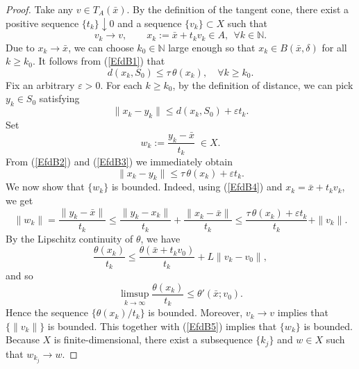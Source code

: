 \documentclass[11pt]{article}
\begin{document}
\begin{proof}
	Take any \(v\in T_A(\bar{x})\). By the definition of the tangent cone, there exist a positive sequence \(\{t_k\}\downarrow 0\) and a sequence \(\{v_k\}\subset X\) such that
	\[
	v_k\to v,\qquad x_k:=\bar{x}+t_k v_k\in A,\ \  \forall k \in \mathbb{N}.
	\]
	Due to  \(x_k\to \bar{x}\), we can choose \(k_0 \in  \mathbb{N}\) large enough so that   \(x_k\in B(\bar{x},\delta)\) for all \(k\ge k_0\).   It follows from  (\ref{EfdB1})  that
	\begin{equation}\label{EfdB2}
		d (x_k,S_0)\le \tau\,\theta(x_k), \quad  \forall k\ge k_0 .  
	\end{equation}
	Fix an arbitrary \(\varepsilon>0\). For each \(k\ge k_0\), by the definition of distance, we can pick \(y_k\in S_0\) satisfying
	\begin{equation}\label{EfdB3}
		\|x_k-y_k\| \le d (x_k,S_0) + \varepsilon t_k.  
	\end{equation}
	Set
	\[
	w_k:=\frac{y_k-\bar{x}}{t_k}\;\in X .
	\]
	From (\ref{EfdB2}) and (\ref{EfdB3}) we immediately obtain
	\begin{equation}\label{EfdB4}
		\|x_k-y_k\| \le \tau\,\theta(x_k) + \varepsilon t_k.  
	\end{equation}
	We now show that \(\{w_k\}\) is bounded. Indeed, using (\ref{EfdB4})  and \(x_k=\bar{x}+t_k v_k\),  we get
	\begin{equation}\label{EfdB5}
		\|w_k\| = \frac{\|y_k-\bar{x}\|}{t_k}
		\le \frac{\|y_k-x_k\|}{t_k} + \frac{\|x_k-\bar{x}\|}{t_k}
		\le \frac{\tau\,\theta(x_k)+\varepsilon t_k}{t_k} + \|v_k\|.
	\end{equation}
	By the Lipschitz continuity of $\theta$,  we have
	\[
	\frac{\theta(x_k)}{t_k} \le \frac{\theta(\bar{x}+t_k v_0)}{t_k} + L \|v_k - v_0\|,
	\]
	and so 
	\begin{equation}\label{EfdB6}	
		\limsup_{k\to\infty} \frac{\theta(x_k)}{t_k} \le \theta'(\bar{x};v_0).	
	\end{equation}
	Hence the sequence \(\{\theta(x_k)/t_k\}\) is bounded. Moreover, \(v_k\to v\) implies that \(\{\|v_k\|\}\) is bounded. This together with   (\ref{EfdB5})  implies that   \(\{w_k\}\) is bounded.
	Because \(X\) is finite-dimensional,   there exist a subsequence \(\{k_j\}\) and   \(w\in X\) such that $ w_{k_j} \to w $.
	

\end{proof}
\end{document}
